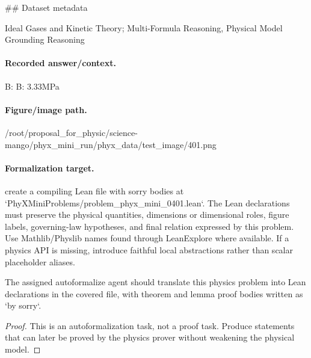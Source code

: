 \#\# Dataset metadata

Ideal Gases and Kinetic Theory; Multi-Formula Reasoning, Physical Model Grounding Reasoning

\paragraph{Recorded answer/context.}
B: B: 3.33MPa

\paragraph{Figure/image path.}
/root/proposal\_for\_physic/science-mango/phyx\_mini\_run/phyx\_data/test\_image/401.png

\paragraph{Formalization target.}
create a compiling Lean file with sorry bodies at `PhyXMiniProblems/problem\_phyx\_mini\_0401.lean`. The Lean declarations must preserve the physical quantities, dimensions or dimensional roles, figure labels, governing-law hypotheses, and final relation expressed by this problem.
Use Mathlib/Physlib names found through LeanExplore where available. If a physics API is missing, introduce faithful local abstractions rather than scalar placeholder aliases.

\begin{theorem}
\label{thm:physics:phyx_mini_0401:target}
The assigned autoformalize agent should translate this physics problem into Lean declarations in the covered file, with theorem and lemma proof bodies written as `by sorry`.
\end{theorem}
\begin{proof}
This is an autoformalization task, not a proof task. Produce statements that can later be proved by the physics prover without weakening the physical model.
\end{proof}

